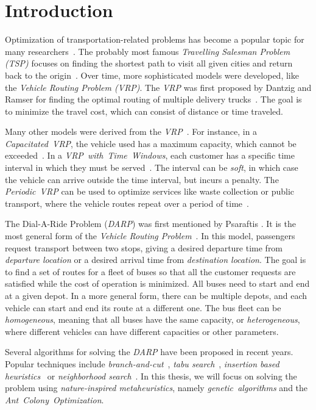 \chapter*{Introduction}

Optimization of transportation-related problems has become a popular topic for many researchers~\cite{surveytransport}. The probably most famous \textit{Travelling Salesman Problem (TSP)} focuses on finding the shortest path to visit all given cities and return back to the origin~\cite{surveytsp}. Over time, more sophisticated models were developed, like the \textit{Vehicle Routing Problem (VRP)}. The \textit{VRP} was first proposed by Dantzig and Ramser for finding the optimal routing of multiple delivery trucks~\cite{Dantzig1959TheTD}. The goal is to minimize the travel cost, which can consist of distance or time traveled.

Many other models were derived from the \textit{VRP}~\cite{VRPSurvey}. For instance, in a \textit{Capacitated~VRP}, the vehicle used has a maximum capacity, which cannot be exceeded~\cite{cvrpsurv}. In a \textit{VRP~with~Time~Windows}, each customer has a specific time interval in which they must be served~\cite{vrptw}. The interval can be \textit{soft}, in which case the vehicle can arrive outside the time interval, but incurs a penalty. The \textit{Periodic~VRP} can be used to optimize services like waste collection or public transport, where the vehicle routes repeat over a period of time~\cite{pvrp2008}.

The Dial-A-Ride Problem (\textit{DARP}) was first mentioned by Psaraftis \cite{psaraftis1980dynamic}. It is the most general form of the \textit{Vehicle Routing Problem}~\cite{darpmunk}. In this model, passengers request transport between two stops, giving a desired departure time from \textit{departure location} or a desired arrival time from \textit{ destination location}. The goal is to find a set of routes for a fleet of buses so that all the customer requests are satisfied while the cost of operation is minimized. All buses need to start and end at a given depot. In a more general form, there can be multiple depots, and each vehicle can start and end its route at a different one. The bus fleet can be \textit{homogeneous}, meaning that all buses have the same capacity, or \textit{heterogeneous}, where different vehicles can have different capacities or other parameters.

Several algorithms for solving the \textit{DARP} have been proposed in recent years. Popular techniques include \textit{branch-and-cut}~\cite{branchandcutcordeau}, \textit{tabu search}~\cite{tabucordeau}, \textit{insertion based heuristics}~\cite{insertionjaw} or \textit{neighborhood search}~\cite{neighbourhoodparragh}. In this thesis, we will focus on solving the problem using \textit{nature-inspired metaheuristics}, namely \textit{genetic~algorithms} and the \textit{Ant~Colony~Optimization}.


